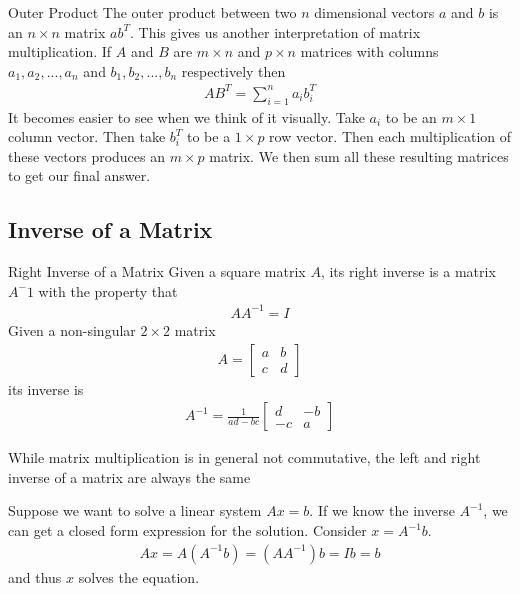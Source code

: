 \documentclass[11pt]{article}
\begin{document}
\begin{definitionbox}{Outer Product}
    The outer product between two $n$ dimensional vectors $a$ and $b$ is an $n \times n$ matrix $ab^T$.
    This gives us another interpretation of matrix multiplication. If $A$ and $B$ are $m \times n$ and
    $p \times n$ matrices with columns $a_1,a_2,...,a_n$ and $b_1,b_2,...,b_n$ respectively then
    \begin{align*}
        AB^T = \sum_{i=1}^{n} a_ib_i^T
    \end{align*}
    It becomes easier to see when we think of it visually. Take $a_i$ to be an $m \times 1$ column
    vector. Then take $b_i^T$ to be a $1 \times p$ row vector. Then each multiplication of these vectors
    produces an $m \times p$ matrix. We then sum all these resulting matrices to get our final answer.
\end{definitionbox}

\subsection{Inverse of a Matrix}
\begin{definitionbox}{Right Inverse of a Matrix}
    Given a square matrix $A$, its right inverse is a matrix $A^-1$ with the property that
    \begin{align*}
        AA^{-1}=I
    \end{align*}
    Given a non-singular $2 \times 2$ matrix
    \begin{align*}
        A=
        \begin{bmatrix}
            a & b \\
            c & d
        \end{bmatrix}
    \end{align*}
    its inverse is
    \begin{align*}
        A^{-1}=
        \frac{1}{ad-bc}
        \begin{bmatrix}
            d & -b \\
            -c & a
        \end{bmatrix}
    \end{align*}
\end{definitionbox}
While matrix multiplication is in general not commutative, the left and right inverse of a matrix are
always the same

Suppose we want to solve a linear system $Ax=b$. If we know the inverse $A^{-1}$, we can get a closed
form expression for the solution. Consider $x=A^{-1}b$.
\begin{align*}
    Ax = A(A^{-1}b) = (AA^{-1})b = Ib = b
\end{align*}
and thus $x$ solves the equation.
\end{document}
